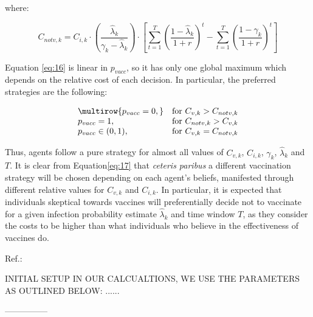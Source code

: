 \documentclass[11pt]{article}
\begin{document}
where: 

\begin{equation}\label{eq:16}
	C_{notv,k}=C_{i,k} \cdot \left( \frac{\hat{\lambda}_{k}}{\gamma_{k}-\hat{\lambda}_{k}} \right) \cdot \left[\sum_{t = 1}^{T} \left(\frac{1-\hat{\lambda}_{k}}{1+r}\right)^t - \sum_{t = 1}^{T}\left(\frac{1-\gamma_k}{1+r}\right)^t\right]
\end{equation}

Equation \eqref{eq:16} is linear in \(p_{vacc}\), so it has only one global maximum which depends on the relative cost of each decision. In particular, the preferred strategies are the following:

\begin{equation}\label{eq:17}
	\begin{array}
	{@{}lr@{}}
        \multirow{p_{vacc}=0,} & \text{for }C_{v,k}>C_{notv,k} \\
        {p_{vacc}=1,} & \text{for }C_{notv,k}>C_{v,k} \\
        {p_{vacc}\in(0,1),} & \text{for }C_{v,k}=C_{notv,k} \\
    \end{array}
\end{equation}

Thus, agents follow a pure strategy for almost all values of \(C_{v,k}\), \(C_{i,k}\), \(\gamma_{k}\), \(\hat{\lambda}_{k}\) and \(T\). It is clear from Equation\eqref{eq:17} that \textit{ceteris paribus} a different vaccination strategy will be chosen depending on each agent's beliefs, manifested through different relative values for \(C_{v,k}\) and \(C_{i,k}\). In particular, it is expected that individuals skeptical towards vaccines will preferentially decide not to vaccinate for a given infection probability estimate \(\hat{\lambda}_{k}\) and time window \(T\), as they consider the costs to be higher than what individuals who believe in the effectiveness of vaccines do.

Ref.:
\cite{shim2012}



INITIAL SETUP
IN OUR CALCUALTIONS, WE USE THE PARAMETERS AS OUTLINED BELOW:
......


--------------- \\
\end{document}
